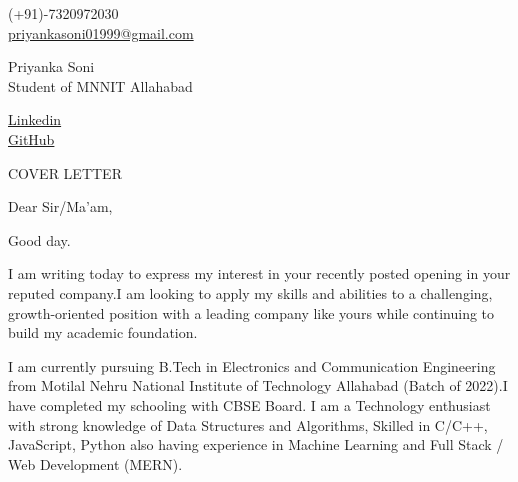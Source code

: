 \documentclass[11pt,a4]{article}
\begin{document}
\begin{center}
    \begin{minipage}[b]{0.24\textwidth}
    \large (+91)-7320972030 \\
    \large \href{mailto:priyankasoni01999@gmail.com}{priyankasoni01999@gmail.com} 
\end{minipage} 
\begin{minipage}[b]{0.5\textwidth}
            \centering
            {\Huge Priyanka Soni} \\ %
            \vspace{0.1cm}
            {\color{UI_blue} \Large{Student of MNNIT Allahabad}} \\
    \end{minipage}%
    \begin{minipage}[b]{0.24\textwidth}
            \flushright \large
            {\href{https://www.linkedin.com/in/priyanka-soni-131668176}{Linkedin} } \\
            \href{https://github.com/PSoni8}{GitHub}
    \end{minipage}   
    
\vspace{-0.15cm} 
{\color{UI_blue} \hrulefill}
\end{center}

\justify
\setlength{\parindent}{0pt}
\setlength{\parskip}{12pt}
\vspace{0.2cm}
\begin{center}
    {\color{UI_blue} \Large{COVER LETTER}}
\end{center}

Dear Sir/Ma'am,

Good day.

I am writing today to express my interest in your recently posted opening in your reputed company.I am looking to apply my skills and abilities to a challenging, growth-oriented position with a leading company like yours while continuing to build my academic foundation.\par

I am currently pursuing B.Tech in Electronics and Communication Engineering from Motilal Nehru National Institute of Technology Allahabad (Batch of 2022).I have completed my schooling with CBSE Board. I am a Technology enthusiast with strong knowledge of Data Structures and Algorithms, Skilled in C/C++, JavaScript, Python also having experience in Machine Learning and Full Stack / Web Development (MERN).\par
\end{document}
